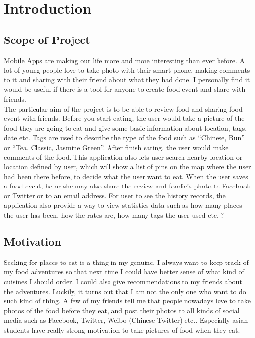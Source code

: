 \chapter{Introduction}


\section{Scope of Project} %
\label{sec:scope_of_project}
Mobile Apps are making our life more and more interesting than ever before. A lot of young people love to take photo with their smart phone, making comments to it and sharing with their friend about what they had done. I personally find it would be useful if there is a tool for anyone to create food event and share with friends.\\

The particular aim of the project is to be able to review food and sharing food event with friends. Before you start eating, the user would take a picture of the food they are going to eat and give some basic information about location, tags, date etc. Tags are used to describe the type of the food such as ``Chinese, Bun'' or ``Tea, Classic, Jasmine Green''. After finish eating, the user would make comments of the food. This application also lets user search nearby location or location defined by user, which will show a list of pins on the map where the user had been there before, to decide what the user want to eat. When the user saves a food event, he or she may also share the review and foodie's photo to Facebook or Twitter or to an email address. For user to see the history records, the application also provide a way to view statistics data such as how many places the user has been, how the rates are, how many tags the user used etc. ?
 

\section{Motivation} %
\label{sec:motivation}
Seeking for places to eat is a thing in my genuine. I always want to keep track of my food adventures so that next time I could have better sense of what kind of cuisines I should order. I could also give recommendations to my friends about the adventures. Luckily, it turns out that I am not the only one who want to do such kind of thing. A few of my friends tell me that people nowadays love to take photos of the food before they eat, and post their photos to all kinds of social media such as Facebook, Twitter, Weibo (Chinese Twitter) etc.. Especially asian students have really strong motivation to take pictures of food when they eat. \\

